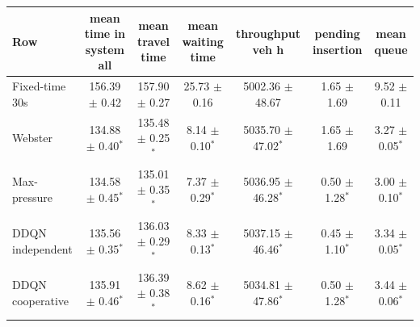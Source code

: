 \begin{tabular}{lcccccc}
\toprule
Row & mean time in system all & mean travel time & mean waiting time & throughput veh h & pending insertion & mean queue \\
\midrule
Fixed-time 30s & 156.39 $\pm$ 0.42 & 157.90 $\pm$ 0.27 & 25.73 $\pm$ 0.16 & 5002.36 $\pm$ 48.67 & 1.65 $\pm$ 1.69 & 9.52 $\pm$ 0.11 \\
Webster & 134.88 $\pm$ 0.40$^{*}$ & 135.48 $\pm$ 0.25$^{*}$ & 8.14 $\pm$ 0.10$^{*}$ & 5035.70 $\pm$ 47.02$^{*}$ & 1.65 $\pm$ 1.69 & 3.27 $\pm$ 0.05$^{*}$ \\
Max-pressure & 134.58 $\pm$ 0.45$^{*}$ & 135.01 $\pm$ 0.35$^{*}$ & 7.37 $\pm$ 0.29$^{*}$ & 5036.95 $\pm$ 46.28$^{*}$ & 0.50 $\pm$ 1.28$^{*}$ & 3.00 $\pm$ 0.10$^{*}$ \\
DDQN independent & 135.56 $\pm$ 0.35$^{*}$ & 136.03 $\pm$ 0.29$^{*}$ & 8.33 $\pm$ 0.13$^{*}$ & 5037.15 $\pm$ 46.46$^{*}$ & 0.45 $\pm$ 1.10$^{*}$ & 3.34 $\pm$ 0.05$^{*}$ \\
DDQN cooperative & 135.91 $\pm$ 0.46$^{*}$ & 136.39 $\pm$ 0.38$^{*}$ & 8.62 $\pm$ 0.16$^{*}$ & 5034.81 $\pm$ 47.86$^{*}$ & 0.50 $\pm$ 1.28$^{*}$ & 3.44 $\pm$ 0.06$^{*}$ \\
\bottomrule
\end{tabular}
